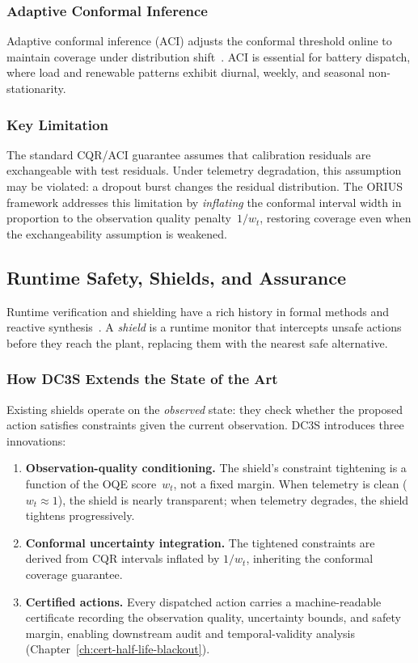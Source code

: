 \subsubsection{Adaptive Conformal Inference}

Adaptive conformal inference (ACI) adjusts the conformal threshold online
to maintain coverage under distribution shift~\cite{gibbs2021adaptive}.
ACI is essential for battery dispatch, where load and renewable patterns
exhibit diurnal, weekly, and seasonal non-stationarity.

\subsubsection{Key Limitation}

The standard CQR/ACI guarantee assumes that calibration residuals are
exchangeable with test residuals.  Under telemetry degradation, this
assumption may be violated: a dropout burst changes the residual
distribution.  The ORIUS framework addresses this limitation by
\emph{inflating} the conformal interval width in proportion to the
observation quality penalty~$1/w_t$, restoring coverage even when the
exchangeability assumption is weakened.

\subsection{Runtime Safety, Shields, and Assurance}

Runtime verification and shielding have a rich history in formal methods
and reactive synthesis~\cite{bloem2015shield}.  A \emph{shield} is a
runtime monitor that intercepts unsafe actions before they reach the
plant, replacing them with the nearest safe alternative.

\subsubsection{How DC3S Extends the State of the Art}

Existing shields operate on the \emph{observed} state: they check whether
the proposed action satisfies constraints given the current observation.
DC3S introduces three innovations:

\begin{enumerate}
  \item \textbf{Observation-quality conditioning.}  The shield's
    constraint tightening is a function of the OQE score~$w_t$, not a
    fixed margin.  When telemetry is clean ($w_t \approx 1$), the shield
    is nearly transparent; when telemetry degrades, the shield tightens
    progressively.
  \item \textbf{Conformal uncertainty integration.}  The tightened
    constraints are derived from CQR intervals inflated by $1/w_t$,
    inheriting the conformal coverage guarantee.
  \item \textbf{Certified actions.}  Every dispatched action carries a
    machine-readable certificate recording the observation quality,
    uncertainty bounds, and safety margin, enabling downstream audit
    and temporal-validity analysis
    (Chapter~\ref{ch:cert-half-life-blackout}).
\end{enumerate}

